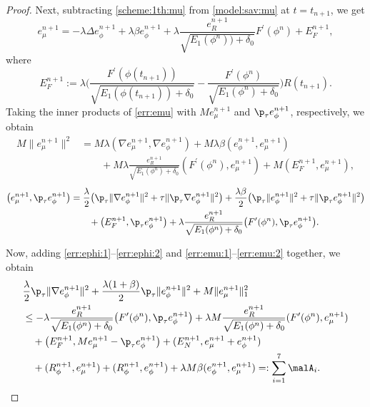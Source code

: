 \begin{proof}
	Next, subtracting \eqref{scheme:1th:mu} from \eqref{model:sav:mu} at $t=t_{n+1}$, we get
	\begin{equation}  \label{err:emu}
		e_\mu^{n+1}=- \lambda\Delta e_\phi^{n+1}+ \lambda \beta e_\phi^{n+1} + \lambda \frac{e_R^{n+1}}{\sqrt{E_1(\phi^{n}))+\delta_0}} F^{\prime}(\phi^{n})+E_F^{n+1},
	\end{equation} 
	where  
	\begin{equation*}  
		E_F^{n+1}:=\lambda  \Big(\frac{F^{\prime}(\phi(t_{n+1}))}{\sqrt{E_1(\phi(t_{n+1}))+\delta_0}}-\frac{F^{\prime}(\phi^n)}{\sqrt{E_1(\phi^n)+\delta_0}}\Big) R(t_{n+1}).
	\end{equation*} 
	Taking the inner products of \eqref{err:emu} with $M e_\mu^{n+1}$ and $\p_\tau e_\phi^{n+1}$, respectively, we obtain
	\begin{equation} \label{err:emu:1}
		\begin{aligned}
			M\|e_\mu^{n+1}\|^2 
			& =    M \lambda(\nabla e_\mu^{n+1}, \nabla e_\phi^{n+1}) +M  \lambda 
			\beta(e_\phi^{n+1},e_\mu^{n+1}) \\
			&\qquad +M \lambda  \frac{ e_R^{n+1}}{\sqrt{E_1(\phi^{n})+\delta_0}}(F^{\prime}(\phi^{n}), e_\mu^{n+1})+M(E_F^{n+1}, e_\mu^{n+1}),
		\end{aligned}
	\end{equation}
	\begin{equation} \label{err:emu:2}
		\begin{aligned}
			\big( e_\mu^{n+1},\p_\tau  e_\phi^{n+1}\big)
			& =  \frac{\lambda }{2}\big( \p_\tau \|\nabla e_\phi^{n+1}\|^2 + \tau\|\p_\tau  \nabla e_\phi^{n+1}\|^2\big)  
			+  \frac{\lambda \beta}{2}\big( \p_\tau\| e_\phi^{n+1}\|^2 + \tau\|\p_\tau   e_\phi^{n+1}\|^2\big)\\
			& \qquad  +\big(E_F^{n+1}, \p_\tau  e_\phi^{n+1}\big) + \lambda \frac{e_R^{n+1}}{\sqrt{E_1(\phi^{n})+\delta_0}} \big(F^{\prime}(\phi^{n}),\p_\tau  e_\phi^{n+1}\big)   .
		\end{aligned}
	\end{equation}
	
	
	Now, adding \eqref{err:ephi:1}--\eqref{err:ephi:2} and \eqref{err:emu:1}--\eqref{err:emu:2} together, we obtain
	\begin{equation} \label{err:CH:all:e1}
		\begin{aligned}
			&\frac{\lambda }{2}  \p_\tau \|\nabla e_\phi^{n+1}\|^2 %
			+\frac{\lambda (1+\beta)}{2}  \p_\tau\| e_\phi^{n+1}\|^2 %
			+ M\| e_\mu^{n+1}\|_1^2 \\
			&  \le - \lambda \frac{e_R^{n+1}}{\sqrt{E_1(\phi^{n})+\delta_0}} \big(F^{\prime}(\phi^{n}),\p_\tau  e_\phi^{n+1}\big)+\lambda M   \frac{e_R^{n+1}}{\sqrt{E_1(\phi^{n})+\delta_0}}(F^{\prime}(\phi^{n}), e_\mu^{n+1}) \\
			& \quad +\big(E_F^{n+1}, M e_\mu^{n+1}-\p_\tau  e_\phi^{n+1}\big)+ (E_N^{n+1}, e_\mu^{n+1}+e_\phi^{n+1}) \\
			& \quad  +(R_\phi^{n+1}, e_\mu^{n+1})+(R_\phi^{n+1}, e_\phi^{n+1})+ \lambda M\beta(e_\phi^{n+1},e_\mu^{n+1})
			=:\sum\limits_{i=1}^7\malA_i.
		\end{aligned}
	\end{equation}
	

\end{proof}
